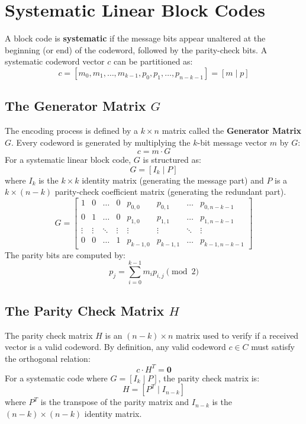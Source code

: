 \documentclass[12pt,a4paper]{article}
\begin{document}
\section{Systematic Linear Block Codes}

A block code is \textbf{systematic} if the message bits appear unaltered at the beginning (or end) of the codeword, followed by the parity-check bits. A systematic codeword vector $c$ can be partitioned as:
\[ c = [m_0, m_1, \dots, m_{k-1}, p_0, p_1, \dots, p_{n-k-1}] = [m \mid p] \]

\subsection{The Generator Matrix \texorpdfstring{$G$}{G}}
The encoding process is defined by a $k \times n$ matrix called the \textbf{Generator Matrix} $G$. Every codeword is generated by multiplying the $k$-bit message vector $m$ by $G$:
\[ c = m \cdot G \]
For a systematic linear block code, $G$ is structured as:
\[ G = [I_k \mid P] \]
where $I_k$ is the $k \times k$ identity matrix (generating the message part) and $P$ is a $k \times (n-k)$ parity-check coefficient matrix (generating the redundant part).
\[ G = \begin{bmatrix}
  1 & 0 & \dots & 0 & p_{0,0} & p_{0,1} & \dots & p_{0,n-k-1} \\
  0 & 1 & \dots & 0 & p_{1,0} & p_{1,1} & \dots & p_{1,n-k-1} \\
  \vdots & \vdots & \ddots & \vdots & \vdots & \vdots & \ddots & \vdots \\
  0 & 0 & \dots & 1 & p_{k-1,0} & p_{k-1,1} & \dots & p_{k-1,n-k-1}
\end{bmatrix} \]
The parity bits are computed by:
\[ p_j = \sum_{i=0}^{k-1} m_i p_{i,j} \pmod 2 \]

\subsection{The Parity Check Matrix \texorpdfstring{$H$}{H}}
The parity check matrix $H$ is an $(n-k) \times n$ matrix used to verify if a received vector is a valid codeword. By definition, any valid codeword $c \in C$ must satisfy the orthogonal relation:
\[ c \cdot H^T = \mathbf{0} \]
For a systematic code where $G = [I_k \mid P]$, the parity check matrix is:
\[ H = [P^T \mid I_{n-k}] \]
where $P^T$ is the transpose of the parity matrix and $I_{n-k}$ is the $(n-k) \times (n-k)$ identity matrix.
\end{document}
